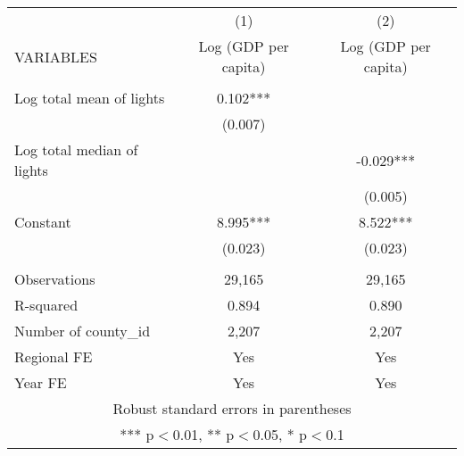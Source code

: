 \documentclass[]{article}
\begin{document}
\begin{tabular}{lcc} \hline
 & (1) & (2) \\
VARIABLES & Log (GDP per capita) & Log (GDP per capita) \\ \hline
 &  &  \\
Log total mean of lights & 0.102*** &  \\
 & (0.007) &  \\
Log total median of lights &  & -0.029*** \\
 &  & (0.005) \\
Constant & 8.995*** & 8.522*** \\
 & (0.023) & (0.023) \\
 &  &  \\
Observations & 29,165 & 29,165 \\
R-squared & 0.894 & 0.890 \\
Number of county\_id & 2,207 & 2,207 \\
Regional FE & Yes & Yes \\
 Year FE & Yes & Yes \\ \hline
\multicolumn{3}{c}{ Robust standard errors in parentheses} \\
\multicolumn{3}{c}{ *** p$<$0.01, ** p$<$0.05, * p$<$0.1} \\
\end{tabular}
\end{document}
